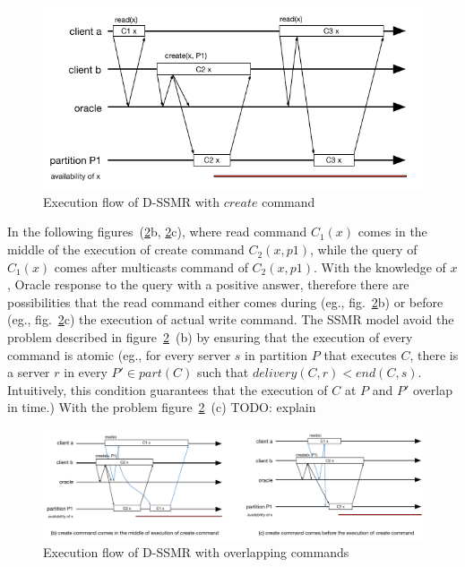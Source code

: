 \begin{figure}
\begin{minipage}[b]{1.0\linewidth} %
\centering
      \includegraphics[width=0.6\linewidth]{figures/read_common}
\end{minipage}
\caption{Execution flow of D-SSMR with $create$ command}
\label{fig:read}
\end{figure}

In the following figures~(\ref{fig:readoverlap}b, \ref{fig:readoverlap}c), where read command $C_1(x)$ comes in the middle of the execution of create command $C_2(x,p1)$, while the query of $C_1(x)$ comes after multicasts command of $C_2(x,p1)$. With the knowledge of $x$, Oracle response to the query with a positive answer, therefore there are possibilities that the read command either comes during (eg., fig.~\ref{fig:readoverlap}b) or before (eg., fig.~\ref{fig:readoverlap}c) the execution of actual write command. The SSMR model avoid the problem described in figure~\ref{fig:readoverlap}~(b) by ensuring that the execution of every command is atomic (eg., for every server $s$ in partition $P$ that executes $C$, there is a server $r$ in every $P' \in part(C)$ such that $delivery(C,r) < end(C,s)$. Intuitively, this condition guarantees that the execution of $C$ at $P$ and $P'$ overlap in time.) With the problem figure~\ref{fig:readoverlap}~(c) TODO: explain

\begin{figure}
\begin{minipage}[b]{1.0\linewidth} %
\centering
      \includegraphics[width=1\linewidth]{figures/read_overlap}
\end{minipage}
\caption{Execution flow of D-SSMR with overlapping commands}
\label{fig:readoverlap}
\end{figure}